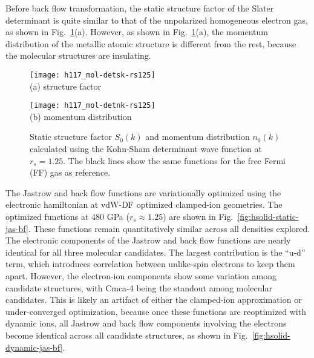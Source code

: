 Before back flow transformation, the static structure factor of the Slater determinant is quite similar to that of the unpolarized homogeneous electron gas, as shown in Fig.~\ref{fig:hsolid-det-sk-nk}(a). However, as shown in  Fig.~\ref{fig:hsolid-det-sk-nk}(a), the momentum distribution of the metallic atomic structure is different from the rest, because the molecular structures are insulating.

\begin{figure}[h]
\centering
\begin{minipage}{0.49\textwidth}
\centering
\texttt{[image: h117\_mol-detsk-rs125]}\\
(a) structure factor
\end{minipage}
\begin{minipage}{0.49\textwidth}
\centering
\texttt{[image: h117\_mol-detnk-rs125]}\\
(b) momentum distribution
\end{minipage}
\caption{Static structure factor $S_0(k)$ and momentum distribution $n_0(k)$ calculated using the Kohn-Sham determinant wave function at $r_s=1.25$. The black lines show the same functions for the free Fermi (FF) gas as reference.}
\label{fig:hsolid-det-sk-nk}
\end{figure}

The Jastrow and back flow functions are variationally optimized using the electronic hamiltonian at vdW-DF optimized clamped-ion geometries. The optimized functions at 480 GPa ($r_s\approx 1.25$) are shown in Fig.~\ref{fig:hsolid-static-jas-bf}.
These functions remain quantitatively similar across all densities explored.
The electronic components of the Jastrow and back flow functions are nearly identical for all three molecular candidates.
The largest contribution is the ``u-d'' term, which introduces correlation between unlike-spin electrons to keep them apart.
However, the electron-ion components show some variation among candidate structures, with Cmca-4 being the standout among molecular candidates.
This is likely an artifact of either the clamped-ion approximation or under-converged optimization, because once these functions are reoptimized with dynamic ions, all Jastrow and back flow components involving the electrons become identical across all candidate structures, as shown in Fig.~\ref{fig:hsolid-dynamic-jas-bf}.


